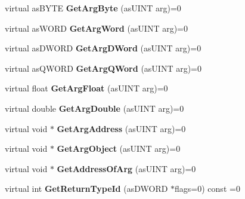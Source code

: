 \begin{DoxyCompactItemize}
virtual as\+B\+Y\+TE {\bfseries Get\+Arg\+Byte} (as\+U\+I\+NT arg)=0
\item 
\mbox{\label{classas_i_script_generic_afdb602c3c2e285c5f34bc477ebbd1534}} 
virtual as\+W\+O\+RD {\bfseries Get\+Arg\+Word} (as\+U\+I\+NT arg)=0
\item 
\mbox{\label{classas_i_script_generic_aab74bcbe4be32fc423b21b75a3f4d57a}} 
virtual as\+D\+W\+O\+RD {\bfseries Get\+Arg\+D\+Word} (as\+U\+I\+NT arg)=0
\item 
\mbox{\label{classas_i_script_generic_a0fbd6ce45aebc29e29a64dac4affc111}} 
virtual as\+Q\+W\+O\+RD {\bfseries Get\+Arg\+Q\+Word} (as\+U\+I\+NT arg)=0
\item 
\mbox{\label{classas_i_script_generic_a487a68e409d79e61fcc624337c4ac991}} 
virtual float {\bfseries Get\+Arg\+Float} (as\+U\+I\+NT arg)=0
\item 
\mbox{\label{classas_i_script_generic_ad0bb07a940b7ba08abc3ce114dca99fc}} 
virtual double {\bfseries Get\+Arg\+Double} (as\+U\+I\+NT arg)=0
\item 
\mbox{\label{classas_i_script_generic_ac5c73473ccefe029582c5e3793d1a41b}} 
virtual void $\ast$ {\bfseries Get\+Arg\+Address} (as\+U\+I\+NT arg)=0
\item 
\mbox{\label{classas_i_script_generic_a6732b01132cd58e81cd0354ac274039a}} 
virtual void $\ast$ {\bfseries Get\+Arg\+Object} (as\+U\+I\+NT arg)=0
\item 
\mbox{\label{classas_i_script_generic_a08f922bc97867e1e97e923a5bdee4dbc}} 
virtual void $\ast$ {\bfseries Get\+Address\+Of\+Arg} (as\+U\+I\+NT arg)=0
\item 
\mbox{\label{classas_i_script_generic_a9da6f7f81392cd25733ebc6c803a397a}} 
virtual int {\bfseries Get\+Return\+Type\+Id} (as\+D\+W\+O\+RD $\ast$flags=0) const =0
\item 
\mbox{\label{classas_i_script_generic_a81c42965dfccfd242e955f50b02a641c}} 

\end{DoxyCompactItemize}
